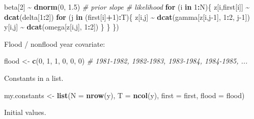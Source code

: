 \documentclass[
  12pt,
]{krantz}
\newenvironment{Shaded}{\begin{snugshade}}{\end{snugshade}}
\newcommand{\AttributeTok}[1]{\textcolor[rgb]{0.13,0.29,0.53}{#1}}
\newcommand{\CommentTok}[1]{\textcolor[rgb]{0.56,0.35,0.01}{\textit{#1}}}
\newcommand{\ControlFlowTok}[1]{\textcolor[rgb]{0.13,0.29,0.53}{\textbf{#1}}}
\newcommand{\DecValTok}[1]{\textcolor[rgb]{0.00,0.00,0.81}{#1}}
\newcommand{\FloatTok}[1]{\textcolor[rgb]{0.00,0.00,0.81}{#1}}
\newcommand{\FunctionTok}[1]{\textcolor[rgb]{0.13,0.29,0.53}{\textbf{#1}}}
\newcommand{\NormalTok}[1]{#1}
\newcommand{\OtherTok}[1]{\textcolor[rgb]{0.56,0.35,0.01}{#1}}
\newcommand{\SpecialCharTok}[1]{\textcolor[rgb]{0.81,0.36,0.00}{\textbf{#1}}}
\begin{document}
\begin{Shaded}
\begin{Highlighting}[]
\NormalTok{  beta[}\DecValTok{2}\NormalTok{] }\SpecialCharTok{\textasciitilde{}} \FunctionTok{dnorm}\NormalTok{(}\DecValTok{0}\NormalTok{, }\FloatTok{1.5}\NormalTok{) }\CommentTok{\# prior slope}
  \CommentTok{\# likelihood}
  \ControlFlowTok{for}\NormalTok{ (i }\ControlFlowTok{in} \DecValTok{1}\SpecialCharTok{:}\NormalTok{N)\{}
\NormalTok{    z[i,first[i]] }\SpecialCharTok{\textasciitilde{}} \FunctionTok{dcat}\NormalTok{(delta[}\DecValTok{1}\SpecialCharTok{:}\DecValTok{2}\NormalTok{])}
    \ControlFlowTok{for}\NormalTok{ (j }\ControlFlowTok{in}\NormalTok{ (first[i]}\SpecialCharTok{+}\DecValTok{1}\NormalTok{)}\SpecialCharTok{:}\NormalTok{T)\{}
\NormalTok{      z[i,j] }\SpecialCharTok{\textasciitilde{}} \FunctionTok{dcat}\NormalTok{(gamma[z[i,j}\DecValTok{{-}1}\NormalTok{], }\DecValTok{1}\SpecialCharTok{:}\DecValTok{2}\NormalTok{, j}\DecValTok{{-}1}\NormalTok{])}
\NormalTok{      y[i,j] }\SpecialCharTok{\textasciitilde{}} \FunctionTok{dcat}\NormalTok{(omega[z[i,j], }\DecValTok{1}\SpecialCharTok{:}\DecValTok{2}\NormalTok{])}
\NormalTok{    \}}
\NormalTok{  \}}
\NormalTok{\})}
\end{Highlighting}
\end{Shaded}

Flood / nonflood year covariate:

\begin{Shaded}
\begin{Highlighting}[]
\NormalTok{flood }\OtherTok{\textless{}{-}} \FunctionTok{c}\NormalTok{(}\DecValTok{0}\NormalTok{, }\DecValTok{1}\NormalTok{, }\DecValTok{1}\NormalTok{, }\DecValTok{0}\NormalTok{, }\DecValTok{0}\NormalTok{, }\DecValTok{0}\NormalTok{) }\CommentTok{\# 1981{-}1982, 1982{-}1983, 1983{-}1984, 1984{-}1985, ...}
\end{Highlighting}
\end{Shaded}

Constants in a list.

\begin{Shaded}
\begin{Highlighting}[]
\NormalTok{my.constants }\OtherTok{\textless{}{-}} \FunctionTok{list}\NormalTok{(}\AttributeTok{N =} \FunctionTok{nrow}\NormalTok{(y),}
                     \AttributeTok{T =} \FunctionTok{ncol}\NormalTok{(y),}
                     \AttributeTok{first =}\NormalTok{ first,}
                     \AttributeTok{flood =}\NormalTok{ flood)}
\end{Highlighting}
\end{Shaded}

Initial values.
\end{document}

